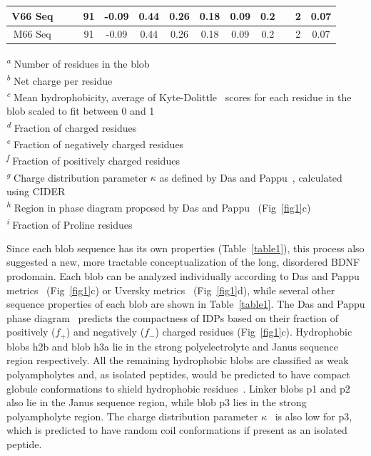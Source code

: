 \documentclass[10pt,letterpaper]{article}
\begin{document}
\begin{table}[!ht]
\begin{adjustwidth}{-2.25in}{0in}
\begin{tabular}{|c|c|c|c|c|c|c|c|c|c|c|c|c|}
\hline
\hline
V66 Seq&& & 91 & -0.09 & 0.44 & 0.26 & 0.18 & 0.09 & 0.2 & & 2 &0.07 \\
\hline
M66 Seq&& & 91 & -0.09 & 0.44 & 0.26 & 0.18 & 0.09 & 0.2 & & 2 &0.07 \\
\hline
\end{tabular}
\begin{flushleft}
\textsuperscript{\emph{a}} Number of residues in the blob\\
\textsuperscript{\emph{b}} Net charge per residue\\
\textsuperscript{\emph{c}} Mean hydrophobicity, average of Kyte-Dolittle~\cite{Kyte1982a} scores for each residue in the blob scaled to fit between 0 and 1 \\
\textsuperscript{\emph{d}} Fraction of charged residues\\
\textsuperscript{\emph{e}} Fraction of negatively charged residues\\
\textsuperscript{\emph{f}} Fraction of positively charged residues\\ 
\textsuperscript{\emph{g}} Charge distribution parameter $\kappa$ as defined by Das and Pappu~\cite{Das2013}, calculated using CIDER~\cite{Holehouse2017} \\
\textsuperscript{\emph{h}} Region in phase diagram proposed by Das and Pappu~\cite{Das2013} (Fig~\ref{fig1}c)\\
\textsuperscript{\emph{i}} Fraction of Proline residues\\
\end{flushleft}
\end{adjustwidth}
\end{table}

Since each blob sequence has its own properties (Table~\ref{table1}), this process also suggested a new, more tractable conceptualization of the long, disordered BDNF prodomain. Each blob can be analyzed individually according to Das and Pappu metrics~\cite{Das2013} (Fig~\ref{fig1}c) or Uversky metrics~\cite{Uversky2000a} (Fig~\ref{fig1}d), while several other sequence properties of each blob are shown in Table~\ref{table1}.
The Das and Pappu phase diagram~\cite{Das2013} predicts the compactness of IDPs based on their fraction of positively ($f_{+}$) and negatively ($f_{-}$) charged residues (Fig~\ref{fig1}c). Hydrophobic blobs h2b and blob h3a lie in the strong polyelectrolyte and Janus sequence region respectively. All the remaining hydrophobic blobs are classified as weak polyampholytes and, as isolated peptides, would be predicted to have compact globule conformations to shield hydrophobic residues~\cite{Das2013}. Linker blobs p1 and p2 also lie in the Janus sequence region, while blob p3 lies in the strong polyampholyte region. The charge distribution parameter $\kappa$~\cite{Das2013} is also low for p3, which is predicted to have random coil conformations if present as an isolated peptide.
\end{document}
